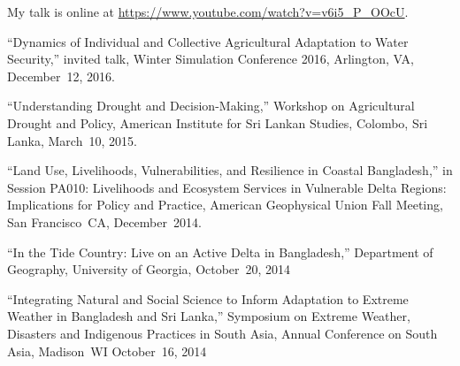   My talk is online at
  \url{https://www.youtube.com/watch?v=v6i5_P_OOcU}.
\item  ``Dynamics of Individual and Collective Agricultural Adaptation to Water
  Security,'' invited talk, Winter Simulation Conference 2016, Arlington, VA,
  December~12, 2016.
\item ``Understanding Drought and Decision-Making,'' Workshop on Agricultural
  Drought and Policy, American Institute for Sri Lankan Studies, Colombo, Sri
  Lanka, March~10, 2015.
\item ``Land Use, Livelihoods, Vulnerabilities, and Resilience in Coastal
  Bangladesh,'' in Session PA010: Livelihoods and Ecosystem Services in
  Vulnerable Delta Regions: Implications for Policy and Practice, American
  Geophysical Union Fall Meeting, San Francisco~CA, December~2014.
\item ``In the Tide Country: Live on an Active Delta in Bangladesh,''
  Department of Geography, University of Georgia, October~20, 2014
\item ``Integrating Natural and Social Science to Inform Adaptation to Extreme
  Weather in Bangladesh and Sri Lanka,'' Symposium on Extreme Weather,
  Disasters and Indigenous Practices in South Asia, Annual Conference on South
  Asia, Madison~WI October~16, 2014
